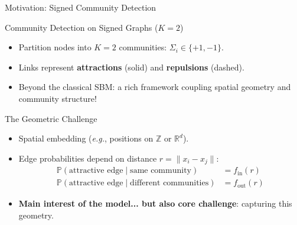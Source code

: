 \documentclass[A4,svgnames,9pt,aspectratio=169]{beamer}
\begin{document}
\begin{frame}{Motivation: Signed Community Detection}
  \begin{block}{Community Detection on Signed Graphs ($K=2$)}
    \begin{itemize}
      \item Partition nodes into $K=2$ communities: $\Sigma_i \in \{+1, -1\}$.
      \item Links represent \textbf{attractions} (solid) and \textbf{repulsions} (dashed).
      \item Beyond the classical SBM: a rich framework coupling spatial geometry and community structure!
    \end{itemize}
  \end{block}
  \begin{block}{The Geometric Challenge}
    \begin{itemize}
      \item Spatial embedding (\emph{e.g.}, positions on $\mathbb{Z}$ or $\mathbb{R}^d$).
      \item Edge probabilities depend on distance $r = \|x_i - x_j\|$:
        \begin{align*}
            \mathbb{P}(\text{attractive edge} \mid \text{same community}) &= f_{\mathrm{in}}(r) \\
            \mathbb{P}(\text{attractive edge} \mid \text{different communities}) &= f_{\mathrm{out}}(r)
        \end{align*}
      \item \textbf{Main interest of the model... but also core challenge}: capturing this geometry.
    \end{itemize}
  \end{block}
\end{frame}
\end{document}
